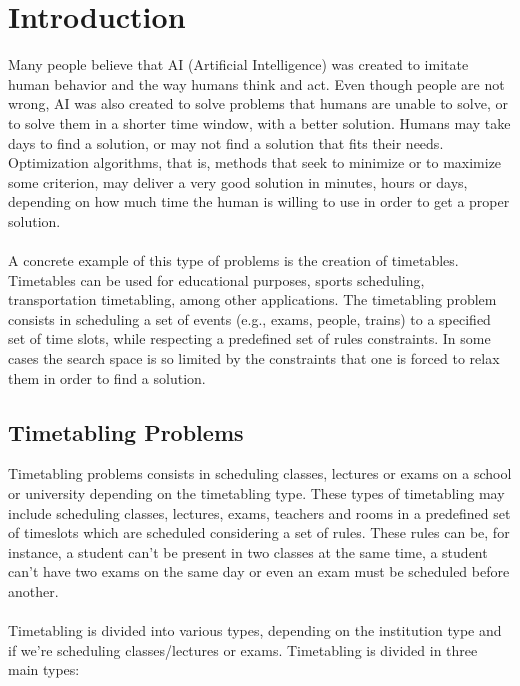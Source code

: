 \setcounter{secnumdepth}{2}
\chapter{Introduction}
\label{introduction}
\thispagestyle{plain}

Many people believe that AI (Artificial Intelligence) was created to imitate human behavior and the way humans think and act. Even though people are not wrong, AI was also created to solve problems that humans are unable to solve, or to solve them in a shorter time window, with a better solution. Humans may take days to find a solution, or may not find a solution that fits their needs. Optimization algorithms, that is, methods that seek to minimize or to maximize some criterion, may deliver a very good solution in minutes, hours or days, depending on how much time the human is willing to use in order to get a proper solution.\\
\\
A concrete example of this type of problems is the creation of timetables. Timetables can be used for educational purposes, sports scheduling, transportation timetabling, among other applications. The timetabling problem consists in scheduling a set of events (e.g., exams, people, trains) to a specified set of time slots, while respecting a predefined set of rules constraints. In some cases the search space is so limited by the constraints that one is forced to relax them in order to find a solution. 


\section{Timetabling Problems}

Timetabling problems consists in scheduling classes, lectures or exams on a school or university depending on the timetabling type. These types of timetabling may include scheduling classes, lectures, exams, teachers and rooms in a predefined set of timeslots which are scheduled considering a set of rules. These rules can be, for instance, a student can't be present in two classes at the same time, a student can't have two exams on the same day or even an exam must be scheduled before another.\\
\\
Timetabling is divided into various types, depending on the institution type and if we're scheduling classes/lectures or exams. Timetabling is divided in three main types:

